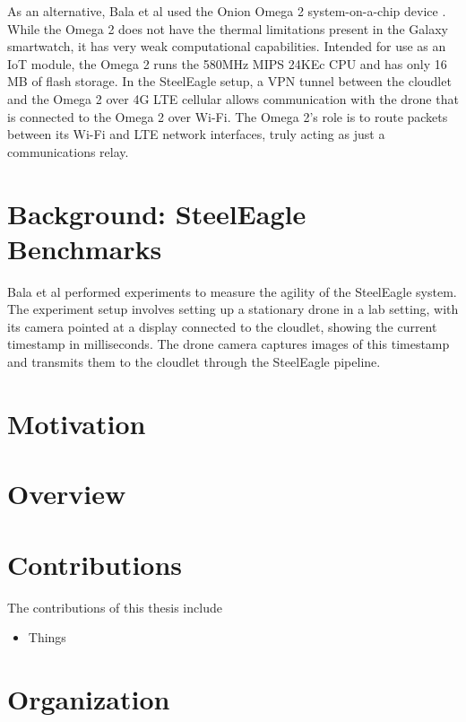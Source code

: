 As an alternative, Bala et al used the Onion Omega 2 system-on-a-chip device
\cite{onionomega2}. While the Omega 2 does not have the thermal limitations
present in the Galaxy smartwatch, it has very weak computational capabilities.
Intended for use as an IoT module, the Omega 2 runs the 580MHz MIPS 24KEc CPU
and has only 16 MB of flash storage. In the SteelEagle setup, a VPN tunnel
between the cloudlet and the Omega 2 over 4G LTE cellular allows communication
with the drone that is connected to the Omega 2 over Wi-Fi. The Omega 2's role
is to route packets between its Wi-Fi and LTE network interfaces, truly acting
as just a communications relay.

\section{Background: SteelEagle Benchmarks}
Bala et al performed experiments to measure the agility of the SteelEagle
system. The experiment setup involves setting up a stationary drone in a lab
setting, with its camera pointed at a display connected to the cloudlet, showing
the current timestamp in milliseconds. The drone camera captures images of this
timestamp and transmits them to the cloudlet through the SteelEagle pipeline.

\section{Motivation}


\section{Overview}


\section{Contributions}

The contributions of this thesis include
\begin{itemize}
  \item Things
\end{itemize}


\section{Organization}
